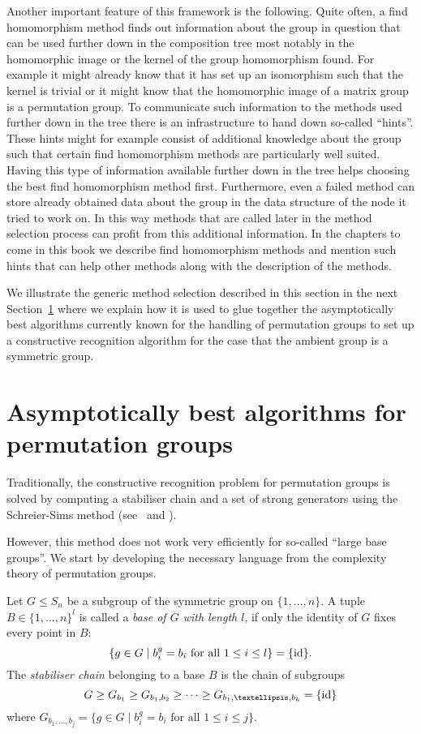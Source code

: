 Another important feature of this framework is the following. Quite often,
a find homomorphism method finds out information about the group in
question that can be used further down in the composition tree most notably
in the homomorphic image or the kernel of the group homomorphism found.
For example it might already know that it has set up an isomorphism such
that the kernel is trivial or it might know that the homomorphic image of a
matrix group is a permutation group. To communicate such information to the
methods used further down in the tree there is an infrastructure to hand
down so-called ``hints''. These hints might for example consist of additional
knowledge about the group such that certain find homomorphism methods
are particularly well suited. Having this type of information available
further down in the tree helps choosing the best find homomorphism method
first. Furthermore, even a failed method can store already 
obtained data about the group in the data structure of the node it tried
to work on. In this way methods that are called later in the method
selection process can profit from this additional information. In the
chapters to come in this book we describe find homomorphism methods
and mention such hints that can help other methods along with the
description of the methods.

We illustrate the generic method selection described in this section
in the next Section~\ref{permgrps} where we explain how it is used to
glue together the asymptotically best algorithms currently known for
the handling of permutation groups to set up a constructive recognition
algorithm for the case that the ambient group is a symmetric group.


\section{Asymptotically best algorithms for permutation groups}
\label{permgrps}

Traditionally, the constructive recognition problem for permutation
groups is solved by computing a stabiliser chain and a set of strong
generators using the Schreier-Sims method (see~\cite{Si} and \cite{Ser}). 

However, this method does not work very efficiently for so-called
``large base groups''. We start by developing the necessary language
from the complexity theory of permutation groups.

\begin{Def}
Let $G \le S_n$ be a subgroup of the symmetric group on $\{1,\ldots,n\}$.
A tuple $B \in \{ 1, \ldots, n\}^l$ is called a \emph{base of $G$ with
length $l$}, if only the identity of $G$ fixes every point in $B$: 
\[ \{ g \in G \mid b_i^g = b_i \mbox{ for all } 1 \le i \le l \} = \{ \id \}. \]
The \emph{stabiliser chain} belonging to a base $B$ is the chain of
subgroups
\[ G \ge G_{b_1} \ge G_{b_1,b_2} \ge \cdots \ge G_{b_1,\ldots,b_k} =
\{\id\} \]
where $G_{b_1, \ldots, b_j} =
\{ g \in G \mid b_i^g = b_i \mbox{ for all } 1 \le i \le j \}$.
\end{Def}

